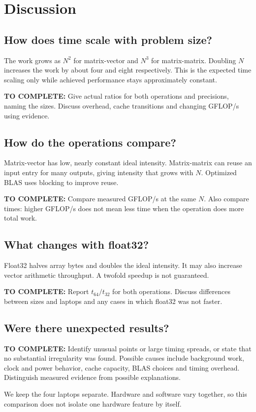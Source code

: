 \documentclass[11pt,a4paper]{article}
\newcommand{\todo}[1]{\par\textcolor{rose}{\textbf{TO COMPLETE:} #1}\par}
\begin{document}
\section{Discussion}
\subsection{How does time scale with problem size?}
The work grows as $N^2$ for matrix-vector and $N^3$ for matrix-matrix.
Doubling $N$ increases the work by about four and eight respectively.
This is the expected time scaling only while achieved performance stays
approximately constant.
\todo{Give actual ratios for both operations and precisions, naming the
sizes. Discuss overhead, cache transitions and changing GFLOP/s using evidence.}

\subsection{How do the operations compare?}
Matrix-vector has low, nearly constant ideal intensity. Matrix-matrix can
reuse an input entry for many outputs, giving intensity that grows with $N$.
Optimized BLAS uses blocking to improve reuse.
\todo{Compare measured GFLOP/s at the same $N$. Also compare times: higher
GFLOP/s does not mean less time when the operation does more total work.}

\subsection{What changes with float32?}
Float32 halves array bytes and doubles the ideal intensity. It may also
increase vector arithmetic throughput. A twofold speedup is not guaranteed.
\todo{Report $t_{64}/t_{32}$ for both operations. Discuss differences between
sizes and laptops and any cases in which float32 was not faster.}

\subsection{Were there unexpected results?}
\todo{Identify unusual points or large timing spreads, or state that no
substantial irregularity was found. Possible causes include background work,
clock and power behavior, cache capacity, BLAS choices and timing overhead.
Distinguish measured evidence from possible explanations.}
We keep the four laptops separate. Hardware and software vary together,
so this comparison does not isolate one hardware feature by itself.
\end{document}
